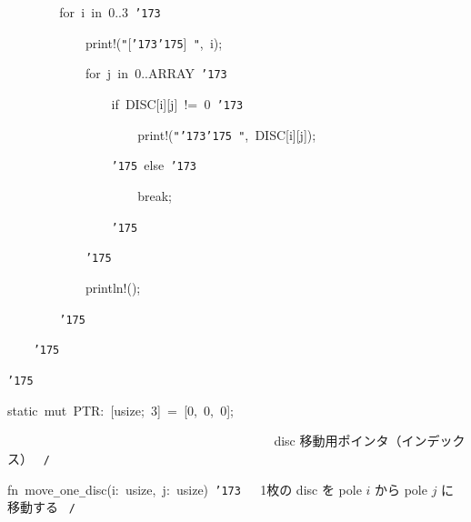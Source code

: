 \documentclass{article}
\begin{document}
\noindent
\mbox{}{\tt\mc \ \ \ \ \ \ \ \ }for{\tt\mc \ }i{\tt\mc \ }in{\tt\mc \ }0..3{\tt\mc \ }{\tt\char'173}

\noindent
\mbox{}{\tt\mc \ \ \ \ \ \ \ \ \ \ \ \ }print!({\tt "}[{\tt\char'173}{\tt\char'175}]{\tt\mc \ }{\tt "},{\tt\mc \ }i);

\noindent
\mbox{}{\tt\mc \ \ \ \ \ \ \ \ \ \ \ \ }for{\tt\mc \ }j{\tt\mc \ }in{\tt\mc \ }0..ARRAY{\tt\mc \ }{\tt\char'173}

\noindent
\mbox{}{\tt\mc \ \ \ \ \ \ \ \ \ \ \ \ \ \ \ \ }if{\tt\mc \ }DISC[i][j]{\tt\mc \ }!={\tt\mc \ }0{\tt\mc \ }{\tt\char'173}

\noindent
\mbox{}{\tt\mc \ \ \ \ \ \ \ \ \ \ \ \ \ \ \ \ \ \ \ \ }print!({\tt "}{\tt\char'173}{\tt\char'175}{\tt\mc \ }{\tt "},{\tt\mc \ }DISC[i][j]);

\noindent
\mbox{}{\tt\mc \ \ \ \ \ \ \ \ \ \ \ \ \ \ \ \ }{\tt\char'175}{\tt\mc \ }else{\tt\mc \ }{\tt\char'173}

\noindent
\mbox{}{\tt\mc \ \ \ \ \ \ \ \ \ \ \ \ \ \ \ \ \ \ \ \ }break;

\noindent
\mbox{}{\tt\mc \ \ \ \ \ \ \ \ \ \ \ \ \ \ \ \ }{\tt\char'175}

\noindent
\mbox{}{\tt\mc \ \ \ \ \ \ \ \ \ \ \ \ }{\tt\char'175}

\noindent
\mbox{}{\tt\mc \ \ \ \ \ \ \ \ \ \ \ \ }println!();

\noindent
\mbox{}{\tt\mc \ \ \ \ \ \ \ \ }{\tt\char'175}

\noindent
\mbox{}{\tt\mc \ \ \ \ }{\tt\char'175}

\noindent
\mbox{}{\tt\char'175}

\noindent
\mbox{}\hfill

\noindent
\mbox{}static{\tt\mc \ }mut{\tt\mc \ }PTR:{\tt\mc \ }[usize;{\tt\mc \ }3]{\tt\mc \ }={\tt\mc \ }[0,{\tt\mc \ }0,{\tt\mc \ }0];

\noindent
\mbox{}{\tt\mc \ \ \ \ \ \ \ \ }{\tt\mc \ \ \ \ \ \ \ \ }{\tt\mc \ \ \ \ \ \ \ \ }{\tt\mc \ \ \ \ \ \ \ \ }{\tt\mc \ \ \ \ \ \ \ \ }\rm\mc {\tt /}{\tt *}\  {}disc 移動用ポインタ（インデックス）
					   \hfill \rm\mc \ {\tt *}{\tt /}
\tt\mc 

\noindent
\mbox{}\hfill

\noindent
\mbox{}fn{\tt\mc \ }move{\tt\_}one{\tt\_}disc(i:{\tt\mc \ }usize,{\tt\mc \ }j:{\tt\mc \ }usize){\tt\mc \ }{\tt\char'173}{\tt\mc \ \ }\rm\mc {\tt /}{\tt *}\  {}1枚の disc を pole $i$ から
					   pole $j$ に移動する \hfill \rm\mc \ {\tt *}{\tt /}
\tt\mc 
\end{document}
